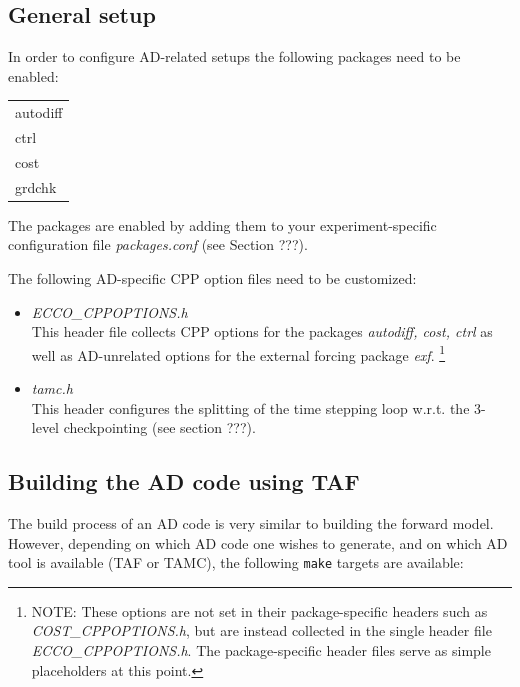 
\subsection{General setup
\label{section_ad_setup}}

In order to configure AD-related setups the following packages need
to be enabled:
{\it
\begin{table}[!ht]
\begin{tabular}{l}
autodiff \\
ctrl \\
cost \\
grdchk \\
\end{tabular}
\end{table}
}
The packages are enabled by adding them to your experiment-specific 
configuration file
{\it packages.conf} (see Section ???).

The following AD-specific CPP option files need to be customized:
%
\begin{itemize}
%
\item {\it ECCO\_CPPOPTIONS.h} \\
This header file collects CPP options for the packages
{\it autodiff, cost, ctrl} as well as AD-unrelated options for
the external forcing package {\it exf}.
\footnote{NOTE: These options are not set in their package-specific 
headers such as {\it COST\_CPPOPTIONS.h}, but are instead collected
in the single header file {\it ECCO\_CPPOPTIONS.h}. 
The package-specific header files serve as simple
placeholders at this point.}
%
\item {\it tamc.h} \\
This header configures the splitting of the time stepping loop
w.r.t. the 3-level checkpointing (see section ???).

%
\end{itemize}


\subsection{Building the AD code using TAF
\label{section_ad_build}}

The build process of an AD code is very similar to building
the forward model. However, depending on which AD code one wishes
to generate, and on which AD tool is available (TAF or TAMC),
the following {\tt make} targets are available:

